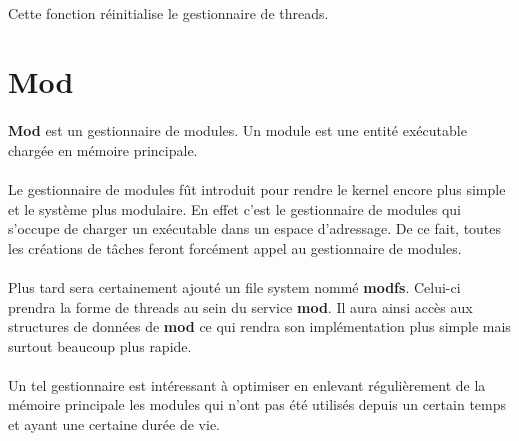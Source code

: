 \documentclass[10pt,a4wide]{article}
\begin{document}
\paragraph{}

Cette fonction r\'einitialise le gestionnaire de threads.

\section{Mod}

\paragraph{}

\textbf{Mod} est un gestionnaire de modules. Un module est une entit\'e
ex\'ecutable charg\'ee en m\'emoire principale.

\paragraph{}

Le gestionnaire de modules f\^ut introduit pour rendre le kernel encore
plus simple et le syst\`eme plus modulaire. En effet c'est le gestionnaire
de modules qui s'occupe de charger un ex\'ecutable dans un espace d'adressage.
De ce fait, toutes les cr\'eations de t\^aches feront forc\'ement appel
au gestionnaire de modules.

\paragraph{}

Plus tard sera certainement ajout\'e un file system nomm\'e \textbf{modfs}.
Celui-ci prendra la forme de threads au sein du service \textbf{mod}. Il aura
ainsi acc\`es aux structures de donn\'ees de \textbf{mod} ce qui rendra
son impl\'ementation plus simple mais surtout beaucoup plus rapide.

\paragraph{}

Un tel gestionnaire est int\'eressant \`a optimiser en enlevant
r\'eguli\`erement de la m\'emoire principale les modules qui n'ont
pas \'et\'e utilis\'es depuis un certain temps et ayant une certaine
dur\'ee de vie.

\paragraph{}
\end{document}
